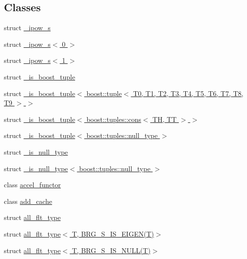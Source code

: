 \subsection*{Classes}
\begin{DoxyCompactItemize}
\item 
struct \hyperlink{structIceBRG_1_1__ipow__s}{\+\_\+ipow\+\_\+s}
\item 
struct \hyperlink{structIceBRG_1_1__ipow__s_3_010_01_4}{\+\_\+ipow\+\_\+s$<$ 0 $>$}
\item 
struct \hyperlink{structIceBRG_1_1__ipow__s_3_011_01_4}{\+\_\+ipow\+\_\+s$<$ 1 $>$}
\item 
struct \hyperlink{structIceBRG_1_1__is__boost__tuple}{\+\_\+is\+\_\+boost\+\_\+tuple}
\item 
struct \hyperlink{structIceBRG_1_1__is__boost__tuple_3_01boost_1_1tuple_3_01T0_00_01T1_00_01T2_00_01T3_00_01T4_00_aeaacd25f11a77396b5b6e53a5953fba}{\+\_\+is\+\_\+boost\+\_\+tuple$<$ boost\+::tuple$<$ T0, T1, T2, T3, T4, T5, T6, T7, T8, T9 $>$ $>$}
\item 
struct \hyperlink{structIceBRG_1_1__is__boost__tuple_3_01boost_1_1tuples_1_1cons_3_01TH_00_01TT_01_4_01_4}{\+\_\+is\+\_\+boost\+\_\+tuple$<$ boost\+::tuples\+::cons$<$ T\+H, T\+T $>$ $>$}
\item 
struct \hyperlink{structIceBRG_1_1__is__boost__tuple_3_01boost_1_1tuples_1_1null__type_01_4}{\+\_\+is\+\_\+boost\+\_\+tuple$<$ boost\+::tuples\+::null\+\_\+type $>$}
\item 
struct \hyperlink{structIceBRG_1_1__is__null__type}{\+\_\+is\+\_\+null\+\_\+type}
\item 
struct \hyperlink{structIceBRG_1_1__is__null__type_3_01boost_1_1tuples_1_1null__type_01_4}{\+\_\+is\+\_\+null\+\_\+type$<$ boost\+::tuples\+::null\+\_\+type $>$}
\item 
class \hyperlink{classIceBRG_1_1accel__functor}{accel\+\_\+functor}
\item 
class \hyperlink{classIceBRG_1_1add__cache}{add\+\_\+cache}
\item 
struct \hyperlink{namespaceIceBRG_structIceBRG_1_1all__flt__type}{all\+\_\+flt\+\_\+type}
\item 
struct \hyperlink{namespaceIceBRG_structIceBRG_1_1all__flt__type_3_01T_00_01BRG__S__IS__EIGEN_07T_08_4}{all\+\_\+flt\+\_\+type$<$ T, B\+R\+G\+\_\+\+S\+\_\+\+I\+S\+\_\+\+E\+I\+G\+E\+N(\+T)$>$}
\item 
struct \hyperlink{namespaceIceBRG_structIceBRG_1_1all__flt__type_3_01T_00_01BRG__S__IS__NULL_07T_08_4}{all\+\_\+flt\+\_\+type$<$ T, B\+R\+G\+\_\+\+S\+\_\+\+I\+S\+\_\+\+N\+U\+L\+L(\+T)$>$}

\end{DoxyCompactItemize}
